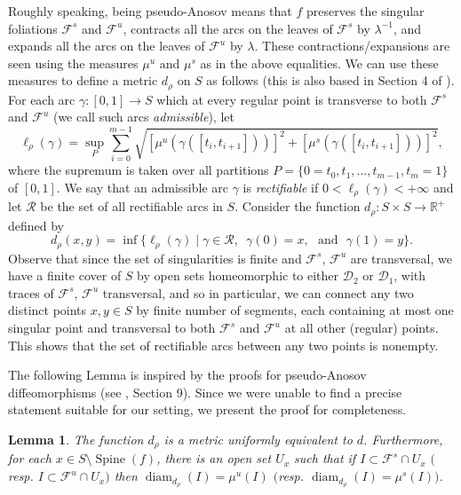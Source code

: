 \documentclass{amsart}
\theoremstyle{plain}
\newtheorem{lemma}[theorem]{Lemma}
\theoremstyle{definition}
\newcommand{\mc}{\mathcal}
\newcommand{\spine}{\operatorname{Spine}}
\newcommand{\diam}{\operatorname{diam}}
\begin{document}
Roughly speaking, being pseudo-Anosov means that $f$ preserves the singular foliations $\mc{F}^s$ and $\mc{F}^u$, contracts all the arcs on the leaves of $\mc{F}^s$ by $\lambda^{-1}$, and expands all the arcs on the leaves of $\mc{F}^u$ by $\lambda$. These contractions/expansions are seen using the measures $\mu^u$ and $\mu^s$ as in the above equalities. We can use these measures to define a metric $d_{\rho}$ on $S$ as follows (this is also based in Section 4 of \cite{C}). For each arc $\gamma\colon[0,1]\to S$ which at every regular point is transverse to both $\mc{F}^s$ and $\mc{F}^u$ (we call such arcs \emph{admissible}), let
$$\ell_\rho(\gamma) = \sup_{P} \sum_{i=0}^{m-1} \sqrt{\left[ \mu^u(\gamma([t_i, t_{i+1}])) \right]^2 + \left[ \mu^s(\gamma([t_i, t_{i+1}])) \right]^2},$$ where the supremum is taken over all partitions $P=\{0=t_0,t_1,\dots,t_{m-1},t_m=1\}$ of $[0,1]$.
We say that an admissible arc $\gamma$ is \emph{rectifiable} if $0<\ell_{\rho}(\gamma)<+\infty$ and let $\mc{R}$ be the set of all rectifiable arcs in $S$. Consider the 
function
$d_{\rho}\colon S\times S\to \mathbb{R}^+$ defined by
\begin{equation}\label{drhodef}
d_\rho(x,y) = \inf \big\{ \ell_\rho(\gamma) \;\big|\; \gamma\in\mc{R}, \,\,\, \gamma(0) = x, \,\,\text{ and }\,\, \gamma(1) = y \big\}.
\end{equation}
Observe that since the set of singularities is finite and $\mc{F}^s$, $\mc{F}^u$ are transversal, we have a finite cover of $S$ by open sets homeomorphic to either $\mc{D}_2$ or $\mc{D}_1$,
with traces of $\mc{F}^s$, $\mc{F}^u$ transversal, and so in particular, we can connect any two distinct points $x,y\in S$ by finite number of segments, each containing at most one singular point and transversal to both $\mc{F}^s$ and $\mc{F}^u$ at all other (regular) points. This shows that the set of rectifiable arcs between any two points is nonempty.

The following Lemma is inspired by the proofs for pseudo-Anosov diffeomorphisms (see \cite{FLPKM}, Section 9). Since we were unable to find a precise statement suitable for our setting, we present the proof for completeness.

\begin{lemma}\label{lem:drho}
The function $d_\rho$ is a metric uniformly equivalent to $d$. 
Furthermore, for each $x\in S\setminus \spine(f)$, there is an open set $U_x$ such that if
$I\subset \mc{F}^s\cap U_x$ $($resp. $I\subset \mc{F}^u\cap U_x)$ 
then $\diam_{d_\rho}(I)= \mu^u(I)$ $($resp. $\diam_{d_\rho}(I)=\mu^s(I))$.
\end{lemma}
\end{document}
